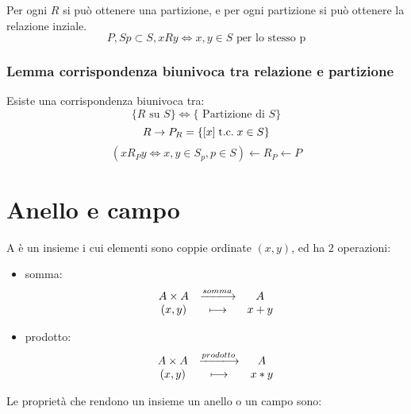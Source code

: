 \documentclass[a4paper,12pt]{article}
\newcommand{\rel}[1][R]{R}
\begin{document}
	Per ogni $\rel$ si può ottenere una partizione, e per ogni partizione si può ottenere la relazione inziale.
	\[P, Sp \subset S, x \rel y \iff x,y \in S \text{ per lo stesso p}\]
	
	\subsubsection{Lemma corrispondenza biunivoca tra relazione e partizione}
	Esiste una corrispondenza biunivoca tra:
	\[\{\rel \text{ su } S\} \iff \{\text{ Partizione di } S\}\]
	\[\rel \rightarrow P_{\rel} = \{[x] \tc x \in S\}\]
	\[(x \rel_P y \iff x,y \in S_p, p \in S )\leftarrow \rel_P \leftarrow P\]
	
	\section{Anello e campo}
	A è un insieme i cui elementi sono coppie ordinate $(x,y)$, ed ha 2 operazioni:
	\begin{itemize}
		\item somma: 
		\[
		\begin{array}{c c c}
			A \times A & \xlongrightarrow{somma} & A \\
			(x, y) & \longmapsto & x + y \\
		\end{array}
		\]
		\item prodotto:
		\[
		\begin{array}{c c c}
			A \times A & \xlongrightarrow{prodotto} & A \\
			(x, y) & \longmapsto & x * y \\
		\end{array}
		\]		
	\end{itemize}
	Le proprietà che rendono un insieme un anello o un campo sono:
\end{document}

